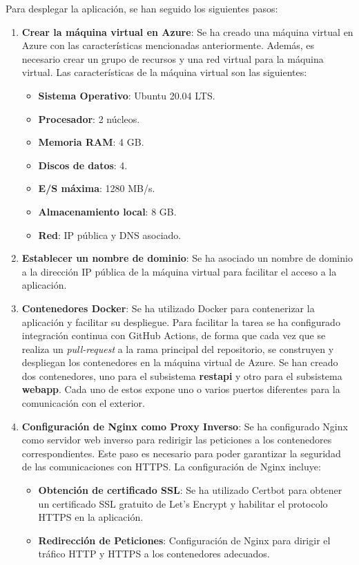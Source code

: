 Para desplegar la aplicación, se han seguido los siguientes pasos:
\begin{enumerate}
    \item \textbf{Crear la máquina virtual en Azure}: Se ha creado una máquina virtual en Azure con las características mencionadas anteriormente. 
    Además, es necesario crear un grupo de recursos y una red virtual para la máquina virtual. Las características de la máquina virtual son las siguientes:
    \begin{itemize}
        \item \textbf{Sistema Operativo}: Ubuntu 20.04 LTS.
        \item \textbf{Procesador}: 2 núcleos.
        \item \textbf{Memoria RAM}: 4 GB.
        \item \textbf{Discos de datos}: 4.
        \item \textbf{E/S máxima}: 1280 MB/s.
        \item \textbf{Almacenamiento local}: 8 GB.
        \item \textbf{Red}: IP pública y DNS asociado.
    \end{itemize}

    \item \textbf{Establecer un nombre de dominio}: Se ha asociado un nombre de dominio a la dirección IP pública de la máquina virtual para facilitar el acceso a la aplicación.

    \item \textbf{Contenedores Docker}: Se ha utilizado Docker para contenerizar la aplicación y facilitar su despliegue. 
    Para facilitar la tarea se ha configurado integración continua con GitHub Actions, de forma que cada vez que se realiza un \textit{pull-request} a la rama principal del repositorio, se construyen y despliegan los contenedores en la máquina virtual de Azure.
    Se han creado dos contenedores, uno para el subsistema \textbf{restapi} y otro para el subsistema \textbf{webapp}. Cada uno de estos expone uno o varios puertos diferentes para la comunicación con el exterior.

    \item \textbf{Configuración de Nginx como Proxy Inverso}: Se ha configurado Nginx como servidor web inverso para redirigir las peticiones a los contenedores correspondientes.
    Este paso es necesario para poder garantizar la seguridad de las comunicaciones con HTTPS. La configuración de Nginx incluye:
    \begin{itemize}
        \item \textbf{Obtención de certificado SSL}: Se ha utilizado Certbot para obtener un certificado SSL gratuito de Let's Encrypt y habilitar el protocolo HTTPS en la aplicación.
        \item \textbf{Redirección de Peticiones}: Configuración de Nginx para dirigir el tráfico HTTP y HTTPS a los contenedores adecuados.
    \end{itemize}


\end{enumerate}
